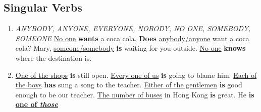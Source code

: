 \subsection{Singular Verbs}
\begin{enumerate}
    \item
        {\it
        ANYBODY, ANYONE, EVERYONE, NOBODY, NO ONE, SOMEBODY, SOMEONE
        }
        \newline
        \newline
        \underline{No one} \textbf{wants} a coca cola.
        \newline
        \textbf{Does} \underline{anybody/anyone} want a coca cola?
        \newline
        \newline
        Mary, \underline{someone/somebody} \textbf{is} waiting for you outside.
        \newline
        \newline
        \underline{No one} \textbf{knows} where the destination is.
    \item
        \newline
        \newline
        \underline{One of the shops} \textbf{is} still open.
        \newline
        \newline
        \underline{Every one of us} \textbf{is} going to blame him.
        \newline
        \newline
        \underline{Each of the boys} \textbf{has} sung a song to the teacher.
        \newline
        \newline
        \underline{Either of the gentlemen} \textbf{is} good enough to be our teacher.
        \newline
        \newline
        \underline{The number of buses} in Hong Kong \textbf{is} great.
        \newline
        \newline
        He \textbf{is \underline{one of {\it those}}
}
\end{enumerate}

